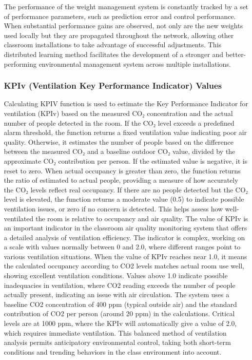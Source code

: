 The performance of the weight management system is constantly tracked by a set of performance parameters, such as prediction error and control performance. When substantial performance gains are observed, not only are the new weights used locally but they are propagated throughout the network, allowing other classroom installations to take advantage of successful adjustments. This distributed learning method facilitates the development of a stronger and better-performing environmental management system across multiple installations.

\subsubsection{KPIv (Ventilation Key Performance Indicator) Values}
Calculating KPIV function is used to estimate the Key Performance Indicator for ventilation (KPIv) based on the measured CO₂ concentration and the actual number of people detected in the room. If the CO₂ level exceeds a predefined alarm threshold, the function returns a fixed ventilation value indicating poor air quality. Otherwise, it estimates the number of people based on the difference between the measured CO₂ and a baseline outdoor CO₂ value, divided by the approximate CO₂ contribution per person. If the estimated value is negative, it is reset to zero. When actual occupancy is greater than zero, the function returns the ratio of estimated to actual people, providing a measure of how accurately the CO₂ levels reflect real occupancy. If there are no people detected but the CO₂ level is elevated, the function returns a moderate value (0.5) to indicate possible ventilation issues, or zero if no concern is detected. This helps assess how well-ventilated the room is relative to occupancy and air quality. 
The value of KPIv is an important indicator in the classroom air quality monitoring system that offers a detailed analysis of ventilation efficiency. The indicator is complex, working on a scale with values normally between 0 and 2.0, where different ranges point to various ventilation situations. When the value of KPIv reaches near 1.0, it means the calculated occupancy according to CO2 levels matches actual room use well, showing excellent ventilation conditions. Values above 1.0 indicate possible inadequacies in ventilation, where CO2 reading exceeds the number of people actually present, indicating an issue with air circulation. The system uses a baseline CO2 concentration of 400 ppm (typical outside air) and the standard contribution of CO2 per person (around 20 ppm) in the calculations. Critical levels are at 1000 ppm, where the KPIv will automatically give a value of 2.0, which requires immediate ventilation. This balanced method of ventilation analysis permits anticipatory environmental control, taking both short-term conditions and trending behaviors in the class environment into account.

